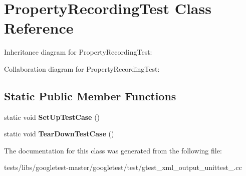 \hypertarget{classPropertyRecordingTest}{}\section{Property\+Recording\+Test Class Reference}
\label{classPropertyRecordingTest}


Inheritance diagram for Property\+Recording\+Test\+:


Collaboration diagram for Property\+Recording\+Test\+:
\subsection*{Static Public Member Functions}
\begin{DoxyCompactItemize}
\item 
\mbox{\label{classPropertyRecordingTest_a673c9dfcd9f0c8d10d0df765852c1669}} 
static void {\bfseries Set\+Up\+Test\+Case} ()
\item 
\mbox{\label{classPropertyRecordingTest_ac0d2d47efbdc4399777dffca6071d15d}} 
static void {\bfseries Tear\+Down\+Test\+Case} ()
\end{DoxyCompactItemize}


The documentation for this class was generated from the following file\+:\begin{DoxyCompactItemize}
\item 
tests/libs/googletest-\/master/googletest/test/gtest\+\_\+xml\+\_\+output\+\_\+unittest\+\_\+.\+cc\end{DoxyCompactItemize}
